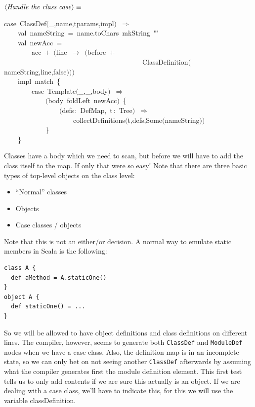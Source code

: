\documentclass[a4paper,12pt]{article}
\begin{document}
$\left<\mbox{\emph{Handle the class case}}\right>\equiv$
\begin{program}{\vem case}~ClassDef$($\_,name,tparams,impl$)$~$\Rightarrow$
\\~~~~{\vem val}~nameString~=~name.toChars~mkString~""
\\~~~~{\vem val}~newAcc~=
\\~~~~~~~~acc~$+$~$($line~$\rightarrow$~$($before~$+$
\\~~~~~~~~~~~~~~~~~~~~~~~~~~~~~~~~~~~~~~~~ClassDefinition$($nameString,line,{\vem false}$)$$)$$)$
\\~~~~impl~{\vem match}~{\small\{}
\\~~~~~~~~{\vem case}~Template$($\_,\_,body$)$~$\Rightarrow$
\\~~~~~~~~~~~~$($body~foldLeft~newAcc$)$~{\small\{}
\\~~~~~~~~~~~~~~~~$($defs\,{\rm :}~DefMap,~t\,{\rm :}~Tree$)$~$\Rightarrow$
\\~~~~~~~~~~~~~~~~~~~~collectDefinitions$($t,defs,Some$($nameString$)$$)$
\\~~~~~~~~~~~~{\small\}}
\\~~~~{\small\}}
\\[0.5em]\end{program}


Classes have a body which we need to scan, but before we will have to add the class
itself to the map. If only that were so easy! Note that there are three basic types
of top-level objects on the class level:

\begin{itemize}
\item ``Normal'' classes
\item Objects
\item Case classes / objects
\end{itemize}

Note that this is not an either/or decision. A normal way to emulate static members in
Scala is the following:

\begin{verbatim}
class A {
  def aMethod = A.staticOne()
}
object A {
  def staticOne() = ...
}
\end{verbatim}

So we will be allowed to have object definitions and class definitions on different
lines. The compiler, however, seems to generate both \texttt{ClassDef} and \texttt{ModuleDef}
nodes when we have a case class. Also, the definition map is in an incomplete state,
so we can only bet on not seeing another \texttt{ClassDef} afterwards by assuming what
the compiler generates first the module definition element.
This first test tells us to only add contents if we are sure this actually is an
object. If we are dealing with a case class, we'll have to indicate this, for this
we will use the variable classDefinition.
\end{document}
